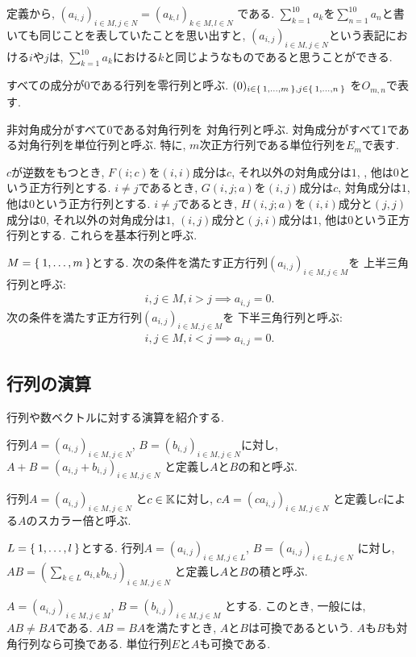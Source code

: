 \begin{remark}
定義から,
$(a_{i,j})_{i\in M, j\in N}=(a_{k,l})_{k\in M, l\in N}$
である.
$\sum_{k=1}^{10}a_k$を$\sum_{n=1}^{10}a_n$と書いても同じことを表していたことを思い出すと,
$(a_{i,j})_{i\in M, j\in N}$という表記における$i$や$j$は,
$\sum_{k=1}^{10}a_k$における$k$と同じようなものであると思うことができる.
\end{remark}

すべての成分が$0$である行列を零行列と呼ぶ.
$(0)_{i\in \Set{1,\ldots,m}, j\in \Set{1,\ldots,n}}$
を$O_{m,n}$で表す.

非対角成分がすべて0である対角行列を
対角行列と呼ぶ.
対角成分がすべて1である対角行列を単位行列と呼ぶ.
特に, $m$次正方行列である単位行列を$E_m$で表す.

$c$が逆数をもつとき,
$F(i;c)$を$(i,i)$成分は$c$, それ以外の対角成分は$1$, , 他は$0$という正方行列とする.
$i\neq j$であるとき,
$G(i,j;a)$を$(i,j)$成分は$c$, 対角成分は$1$, 他は$0$という正方行列とする.
$i\neq j$であるとき,
$H(i,j;a)$を$(i,i)$成分と$(j,j)$成分は$0$, それ以外の対角成分は$1$,
$(i,j)$成分と$(j,i)$成分は$1$,
他は$0$という正方行列とする.
これらを基本行列と呼ぶ.

\begin{definition}
$M=\Set{1,\ldots,m}$とする.
次の条件を満たす正方行列$(a_{i,j})_{i\in M, j\in M}$を
上半三角行列と呼ぶ:
\begin{align*}
i,j\in M, i>j \implies a_{i,j}=0.
\end{align*}
次の条件を満たす正方行列$(a_{i,j})_{i\in M, j\in M}$を
下半三角行列と呼ぶ:
\begin{align*}
i,j\in M, i<j \implies a_{i,j}=0.
\end{align*}
\end{definition}


\subsection{行列の演算}
行列や数ベクトルに対する演算を紹介する.
\begin{definition}
行列$A=(a_{i,j})_{i\in M, j\in N}$,
$B=(b_{i,j})_{i\in M, j\in N}$に対し,
$A+B=(a_{i,j}+b_{i,j})_{i\in M, j\in N}$
と定義し$A$と$B$の和と呼ぶ.
\end{definition}
\begin{definition}
行列$A=(a_{i,j})_{i\in M, j\in N}$
と$c\in \mathbb{K}$に対し,
$cA=(ca_{i,j})_{i\in M, j\in N}$
と定義し$c$による$A$のスカラー倍と呼ぶ.
\end{definition}
\begin{definition}
$L=\Set{1,\ldots,l}$とする.
行列$A=(a_{i,j})_{i\in M, j\in L}$,
$B=(a_{i,j})_{i\in L, j\in N}$
に対し,
$AB=(\sum_{k\in L}a_{i,k}b_{k,j})_{i\in M, j\in N}$
と定義し$A$と$B$の積と呼ぶ.
\end{definition}
\begin{remark}
$A=(a_{i,j})_{i\in M, j\in M}$,
$B=(b_{i,j})_{i\in M, j\in M}$
とする.
このとき,
一般には,
$AB\neq BA$である.
$AB=BA$を満たすとき,
$A$と$B$は可換であるという.
$A$も$B$も対角行列なら可換である.
単位行列$E$と$A$も可換である.
\end{remark}

